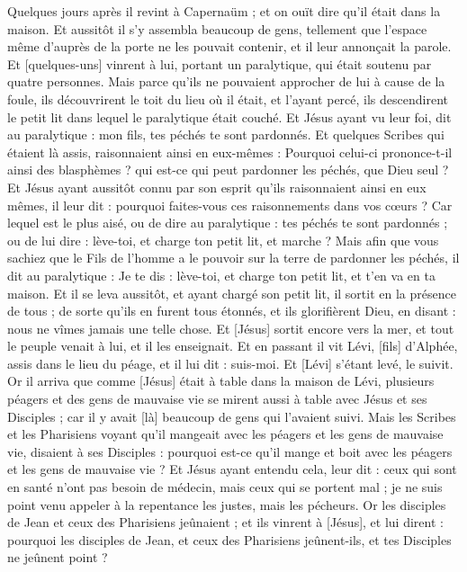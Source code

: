 \begin{multicols}{2}
\VerseOne{}Quelques jours après il revint à Capernaüm ; et on ouït dire qu'il était dans la maison.
Et aussitôt il s'y assembla beaucoup de gens, tellement que l'espace même d'auprès de la porte ne les pouvait contenir, et il leur annonçait la parole.
Et [quelques-uns] vinrent à lui, portant un paralytique, qui était soutenu par quatre personnes.
Mais parce qu'ils ne pouvaient approcher de lui à cause de la foule, ils découvrirent le toit du lieu où il était, et l'ayant percé, ils descendirent le petit lit dans lequel le paralytique était couché.
Et Jésus ayant vu leur foi, dit au paralytique : mon fils, tes péchés te sont pardonnés.
Et quelques Scribes qui étaient là assis, raisonnaient ainsi en eux-mêmes :
Pourquoi celui-ci prononce-t-il ainsi des blasphèmes ? qui est-ce qui peut pardonner les péchés, que Dieu seul ?
Et Jésus ayant aussitôt connu par son esprit qu'ils raisonnaient ainsi en eux mêmes, il leur dit : pourquoi faites-vous ces raisonnements dans vos cœurs ?
Car lequel est le plus aisé, ou de dire au paralytique : tes péchés te sont pardonnés ; ou de lui dire : lève-toi, et charge ton petit lit, et marche ?
Mais afin que vous sachiez que le Fils de l'homme a le pouvoir sur la terre de pardonner les péchés, il dit au paralytique :
Je te dis : lève-toi, et charge ton petit lit, et t'en va en ta maison.
Et il se leva aussitôt, et ayant chargé son petit lit, il sortit en la présence de tous ; de sorte qu'ils en furent tous étonnés, et ils glorifièrent Dieu, en disant : nous ne vîmes jamais une telle chose.
Et [Jésus] sortit encore vers la mer, et tout le peuple venait à lui, et il les enseignait.
Et en passant il vit Lévi, [fils] d'Alphée, assis dans le lieu du péage, et il lui dit : suis-moi. Et [Lévi] s'étant levé, le suivit.
Or il arriva que comme [Jésus] était à table dans la maison de Lévi, plusieurs péagers et des gens de mauvaise vie se mirent aussi à table avec Jésus et ses Disciples ; car il y avait [là] beaucoup de gens qui l'avaient suivi.
Mais les Scribes et les Pharisiens voyant qu'il mangeait avec les péagers et les gens de mauvaise vie, disaient à ses Disciples : pourquoi est-ce qu'il mange et boit avec les péagers et les gens de mauvaise vie ?
Et Jésus ayant entendu cela, leur dit : ceux qui sont en santé n'ont pas besoin de médecin, mais ceux qui se portent mal ; je ne suis point venu appeler à la repentance les justes, mais les pécheurs.
Or les disciples de Jean et ceux des Pharisiens jeûnaient ; et ils vinrent à [Jésus], et lui dirent : pourquoi les disciples de Jean, et ceux des Pharisiens jeûnent-ils, et tes Disciples ne jeûnent point ?

\end{multicols}
